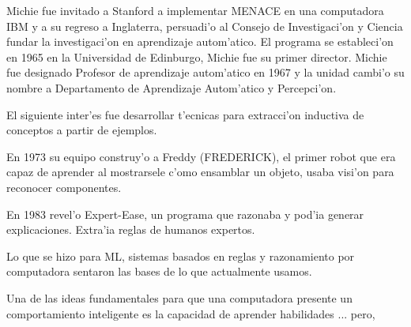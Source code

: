 \documentclass[11pt]{article}
\begin{document}
Michie fue invitado a Stanford a implementar MENACE en una computadora IBM y a su regreso a Inglaterra, persuadi'o al Consejo de Investigaci'on y Ciencia fundar la investigaci'on en aprendizaje autom'atico. El programa se estableci'on en 1965 en la Universidad de Edinburgo, Michie fue su primer director. Michie fue designado Profesor de aprendizaje autom'atico en 1967 y la unidad cambi'o su nombre a Departamento de Aprendizaje Autom'atico y Percepci'on.





El siguiente inter'es fue desarrollar t'ecnicas para extracci'on inductiva de conceptos a partir de ejemplos. 

En 1973 su equipo construy'o a Freddy (FREDERICK), el primer robot que era capaz de aprender al mostrarsele c'omo ensamblar un objeto, usaba visi'on para reconocer componentes.

En 1983 revel'o Expert-Ease, un programa que razonaba y pod'ia generar explicaciones. Extra'ia reglas de humanos expertos. 

Lo que se hizo para ML, sistemas basados en reglas y razonamiento por computadora sentaron las bases de lo que actualmente usamos.

Una de las ideas fundamentales para que una computadora presente un comportamiento inteligente es la capacidad de aprender habilidades ... pero, 
\end{document}

